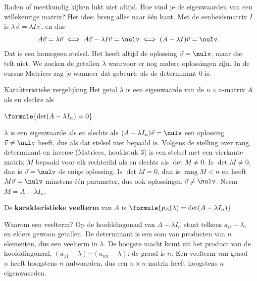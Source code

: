 Raden of meetkundig kijken lukt niet altijd. Hoe vind je de eigenwaarden van een willekeurige matrix? Het idee: breng alles naar één kant. Met de eenheidsmatrix $I$ is $\lambda\vec v = \lambda I\vec v$, en dus
\[ A\vec v = \lambda\vec v \iff A\vec v - \lambda I\vec v = \nulv \iff (A - \lambda I)\vec v = \nulv . \]
Dat is een homogeen stelsel. Het heeft altijd de oplossing $\vec v = \nulv$, maar die telt niet. We zoeken de getallen $\lambda$ waarvoor er nog andere oplossingen zijn. In de cursus Matrices zag je wanneer dat gebeurt: als de determinant 0 is.

\begin{theorie}
\begin{stelling}{Karakteristieke vergelijking}
Het getal $\lambda$ is een eigenwaarde van de $n \times n$-matrix $A$ als en slechts als

\vspace{1mm}
\qquad $\formule{\det(A - \lambda I_n) = 0}$
\end{stelling}

\begin{bewijs}
$\lambda$ is een eigenwaarde als en slechts als $(A - \lambda I_n)\vec v = \nulv$ een oplossing $\vec v \neq \nulv$ heeft, dus als dat stelsel niet bepaald is. Volgens de stelling over rang, determinant en inverse (Matrices, hoofdstuk 3) is een stelsel met een vierkante matrix $M$ bepaald voor elk rechterlid als en slechts als $\det M \neq 0$. Is $\det M \neq 0$, dan is $\vec v = \nulv$ de enige oplossing. Is $\det M = 0$, dan is $\operatorname{rang} M < n$ en heeft $M\vec v = \nulv$ minstens één parameter, dus ook oplossingen $\vec v \neq \nulv$. Neem $M = A - \lambda I_n$.
\end{bewijs}

\vspace{1mm}
De \textbf{\textcolor{accent}{karakteristieke veelterm}} van $A$ is \quad $\formule{p_A(\lambda) = \det(A - \lambda I_n)}$
\end{theorie}

Waarom een veelterm? Op de hoofddiagonaal van $A - \lambda I_n$ staat telkens $a_{ii} - \lambda$, en elders gewoon getallen. De determinant is een som van producten van $n$ elementen, dus een veelterm in $\lambda$. De hoogste macht komt uit het product van de hoofddiagonaal, $(a_{11} - \lambda) \cdots (a_{nn} - \lambda)$: de graad is $n$. Een veelterm van graad $n$ heeft hoogstens $n$ nulwaarden, dus een $n \times n$-matrix heeft hoogstens $n$ eigenwaarden.

